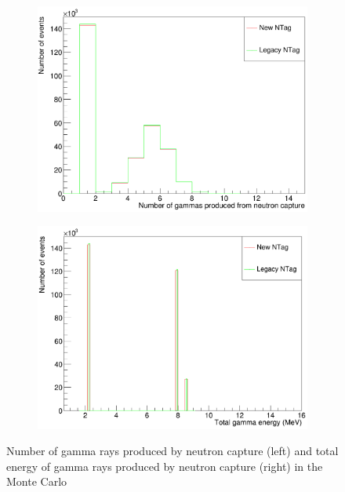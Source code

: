 \begin{figure}
    \centering
     \begin{subfigure}[b]{0.49\linewidth}
      \includegraphics[width=\linewidth]{Figures/NGamma.PNG}
     \end{subfigure}
     \begin{subfigure}[b]{0.49\linewidth}
       \includegraphics[width=\linewidth]{Figures/TotGammaE.PNG}
      \end{subfigure} 
      \caption{Number of gamma rays produced by neutron capture (left) and total energy of gamma rays produced by neutron capture (right) in the Monte Carlo}
      \label{fig:GammaPlots}
\end{figure}

